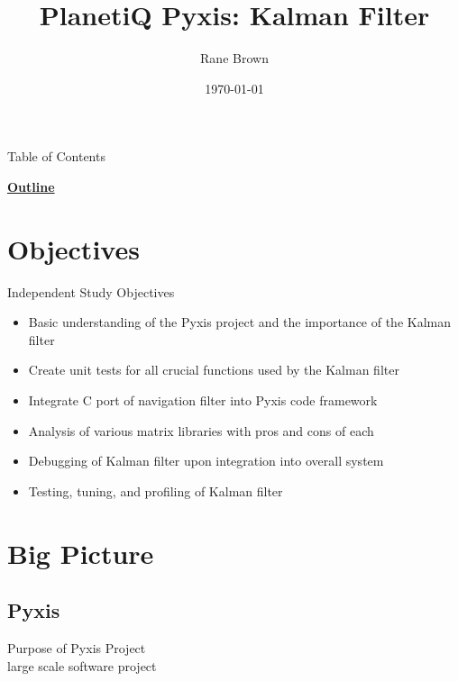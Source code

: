\documentclass[10pt,aspectratio=169]{beamer}
\title{PlanetiQ Pyxis: Kalman Filter}
\institute{University of Colorado Boulder}
\author{Rane Brown}
\date{\today}
\begin{document}
\begin{frame}[t,plain] %
    \titlepage
\end{frame}

\begin{frame}[t]{Table of Contents}
	\begin{center}
		\vspace{-2em}
		{\Large \textbf{\underline{Outline}}}
		\vspace{1em}
	\end{center}
	\begin{multicols}{2}
		\tableofcontents
	\end{multicols}
\end{frame} 

\section{Objectives}%

	\begin{frame}{Independent Study Objectives}
		\begin{itemize}
			\item Basic understanding of the Pyxis project and the importance of the Kalman filter
			\item Create unit tests for all crucial functions used by the Kalman filter
			\item Integrate C port of navigation filter into Pyxis code framework
			\item Analysis of various matrix libraries with pros and cons of each
			\item Debugging of Kalman filter upon integration into overall system
			\item Testing, tuning, and profiling of Kalman filter
		\end{itemize}
	\end{frame}

\section{Big Picture}%

\subsection{Pyxis}
	\begin{frame}{Purpose of Pyxis Project}
	\color{red}{ADD GOOD DESCRIPTION}\\
	large scale software project
	\end{frame}
\end{document}

